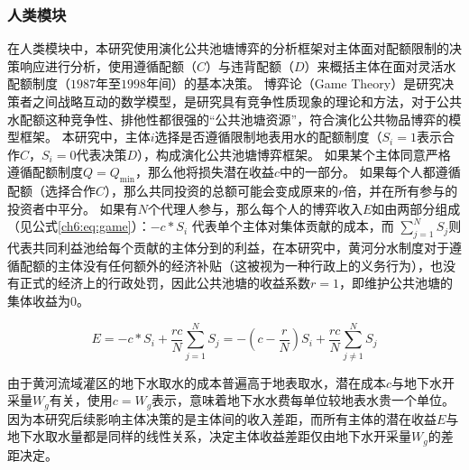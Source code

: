 \subsubsection{人类模块}\label{ch6:sec:society}

在人类模块中，本研究使用演化公共池塘博弈的分析框架对主体面对配额限制的决策响应进行分析，使用遵循配额（$C$）与违背配额（$D$）来概括主体在面对灵活水配额制度（$1987$年至$1998$年间）的基本决策。
博弈论（Game Theory）是研究决策者之间战略互动的数学模型，是研究具有竞争性质现象的理论和方法，对于公共水配额这种竞争性、排他性都很强的“公共池塘资源”，符合演化公共物品博弈的模型框架\cite{ostrom2009, traulsen2010}。
本研究中，主体$i$选择是否遵循限制地表用水的配额制度（$S_i = 1$表示合作$C$，$S_i=0$代表决策$D$），构成演化公共池塘博弈框架。
如果某个主体同意严格遵循配额制度$Q = Q_{\min}$，那么他将损失潜在收益$c$中的一部分。
如果每个人都遵循配额（选择合作$C$），那么共同投资的总额可能会变成原来的$r$倍，并在所有参与的投资者中平分。
如果有$N$个代理人参与，那么每个人的博弈收入$E$如由两部分组成（见公式\ref{ch6:eq:game}）：$-c*S_i$ 代表单个主体对集体贡献的成本，而 $\sum_{j=1}^N S_j$则代表共同利益池给每个贡献的主体分到的利益，在本研究中，黄河分水制度对于遵循配额的主体没有任何额外的经济补贴（这被视为一种行政上的义务行为），也没有正式的经济上的行政处罚，因此公共池塘的收益系数$r = 1$，即维护公共池塘的集体收益为$0$。

\begin{equation}
    \label{ch6:eq:game}
    E=-c * S_i+\frac{r c}{N} \sum_{j=1}^N S_j=-\left(c-\frac{r}{N}\right) S_i+\frac{r c}{N} \sum_{j \neq 1}^N S_j
\end{equation}

由于黄河流域灌区的地下水取水的成本普遍高于地表取水，潜在成本$c$与地下水开采量$W_g$有关，使用$c = W_g$表示，意味着地下水水费每单位较地表水贵一个单位。
因为本研究后续影响主体决策的是主体间的收入差距，而所有主体的潜在收益$E$与地下水取水量都是同样的线性关系，决定主体收益差距仅由地下水开采量$W_g$的差距决定。

